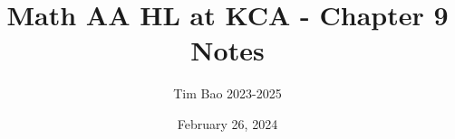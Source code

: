 \documentclass[11pt]{article}
\title{Math AA HL at KCA - Chapter 9 Notes}
\author{Tim Bao 2023-2025}
\date{February 26, 2024}
\begin{document}
\maketitle
\pagebreak
\tableofcontents
\pagebreak
\end{document}
